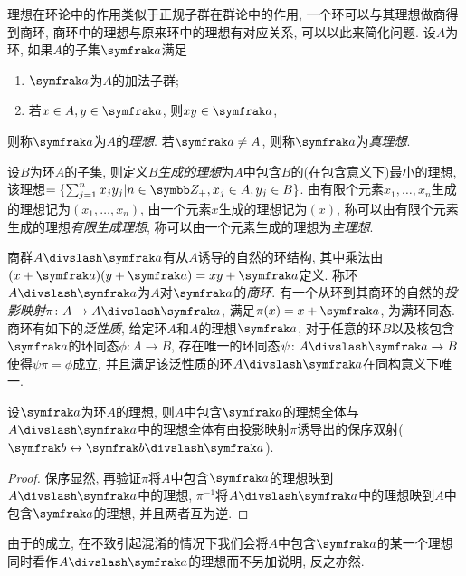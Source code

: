 理想在环论中的作用类似于正规子群在群论中的作用, 一个环可以与其理想做商得到商环, 商环中的理想与原来环中的理想有对应关系, 可以以此来简化问题. 设$A$为环, 如果$A$的子集$\ideal{a}$满足
\begin{enumerate}
  \item $\ideal{a}$为$A$的加法子群;
  \item 若$x\in A, y\in\ideal{a}$, 则$xy\in\ideal{a}$,
\end{enumerate}
则称$\ideal{a}$为$A$的\emph{理想}. 若$\ideal{a}\neq A$, 则称$\ideal{a}$为\emph{真理想}\footnotemark .

设$B$为环$A$的子集, 则定义$B$\emph{生成的理想}为$A$中包含$B$的(在包含意义下)最小的理想, 该理想$=\{\sum_{j=1}^n x_jy_j\vert n\in\ZZ_+, x_j\in A, y_j\in B\}$. 由有限个元素$x_1, \dotsc, x_n$生成的理想记为$(x_1, \dotsc, x_n)$, 由一个元素$x$生成的理想记为$(x)$, 称可以由有限个元素生成的理想\emph{有限生成理想}, 称可以由一个元素生成的理想为\emph{主理想}.

商群$A{\divslash} \ideal{a}$有从$A$诱导的自然的环结构, 其中乘法由$(x+\ideal{a})(y+\ideal{a})=xy+\ideal{a}$定义. 称环$A{\divslash}\ideal{a}$为$A$对$\ideal{a}$的\emph{商环}. 有一个从环到其商环的自然的\emph{投影映射}$\pi\colon A\to A{\divslash}\ideal{a}$, 满足$\pi(x)=x+\ideal{a}$, 为满环同态. 商环有如下的\emph{泛性质}\parencite[5]{altman_term_2017}, 给定环$A$和$A$的理想$\ideal{a}$, 对于任意的环$B$以及核包含$\ideal{a}$的环同态$\phi\colon A\to B$, 存在唯一的环同态$\psi\colon A{\divslash}\ideal{a}\to B$使得$\psi\pi=\phi$成立, 并且满足该泛性质的环$A{\divslash}\ideal{a}$在同构意义下唯一.

\begin{proposition}\label{prop:quotidealcorr}
  设$\ideal{a}$为环$A$的理想, 则$A$中包含$\ideal{a}$的理想全体与$A{\divslash}\ideal{a}$中的理想全体有由投影映射$\pi$诱导出的保序双射($\ideal{b}\leftrightarrow\ideal{b}{\divslash}\ideal{a}$).
\end{proposition}

\begin{proof}
  保序显然, 再验证$\pi$将$A$中包含$\ideal{a}$的理想映到$A{\divslash}\ideal{a}$中的理想, $\pi^{-1}$将$A{\divslash}\ideal{a}$中的理想映到$A$中包含$\ideal{a}$的理想, 并且两者互为逆.
\end{proof}

\begin{remark}
  由于的成立, 在不致引起混淆的情况下我们会将$A$中包含$\ideal{a}$的某一个理想同时看作$A{\divslash}\ideal{a}$的理想而不另加说明, 反之亦然.
\end{remark}

